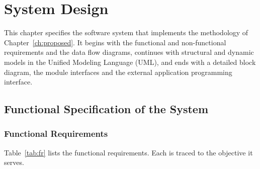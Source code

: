 \chapter{System Design}
\label{ch:design}

This chapter specifies the \veriscript{} software system that implements the
methodology of Chapter~\ref{ch:proposed}. It begins with the functional and
non-functional requirements and the data flow diagrams, continues with
structural and dynamic models in the Unified Modeling Language (UML), and ends
with a detailed block diagram, the module interfaces and the external
application programming interface.

\section{Functional Specification of the System}

\subsection{Functional Requirements}

Table~\ref{tab:fr} lists the functional requirements. Each is traced to the
objective it serves.


